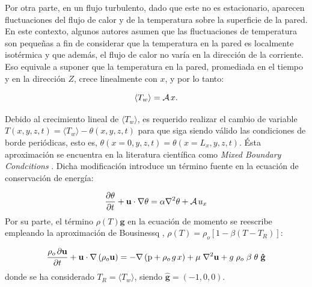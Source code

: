 Por otra parte, en un flujo turbulento, dado que este no es estacionario, aparecen fluctuaciones del flujo de calor y de la temperatura sobre la superficie de la pared. En este contexto, algunos autores \cite{kasagi1992direct,tao1960} asumen que las fluctuaciones de temperatura son pequeñas a fin de considerar que la temperatura en la pared es localmente isotérmica y que además, el flujo de calor no varía en la dirección de la corriente. Eso equivale a suponer que la temperatura en la pared, promediada en el tiempo y en la dirección $Z$, crece linealmente con $x$, y por lo tanto: 

$$
\langle T_w \rangle = \mathcal{A} \hspace{0.5mm} x.
$$

Debido al crecimiento lineal de $\langle T_w \rangle$, es requerido realizar el cambio de variable $T(x,y,z,t) = \langle T_w \rangle - \theta(x,y,z,t)$ para que siga siendo válido las condiciones de borde periódicas, esto es, $\theta(x=0,y,z,t)=\theta(x=L_x,y,z,t)$. Ésta aproximación se encuentra en la literatura científica como \textit{Mixed Boundary Condcitions} \cite{straub2019influence}. Dicha modificación introduce un término fuente en la ecuación de conservación de energía:

\begin{equation}
\frac{ \partial \theta }{ \partial t } + \mathbf{u} \cdot \nabla \theta = \alpha \nabla^2 \theta + \mathcal{A} \hspace{0.5mm} u_x 
\label{eq:energy_pcb_source}
\end{equation}
Por su parte, el término $\rho(T) \mathbf{g}$ en la ecuación de momento se reescribe empleando la aproximación de Bousinessq \cite{incropera}, $\rho(T) = \rho_o \left[ 1 - \beta (T - T_R) \right]$:

\begin{equation}
\frac{ \rho_o \hspace{0.5mm} \partial \mathbf{u}}{\partial t} + \mathbf{u} \cdot \nabla  \left( \rho_o \mathbf{u} \right) = -\nabla \left( \text{p} + \rho_o \hspace{0.5mm} g \hspace{0.5mm} x \right) + \mu \hspace{1mm} {\nabla}^2 \mathbf{u}  + g \hspace{1mm} \rho_o \hspace{1mm} \beta \hspace{1mm} \theta \hspace{1mm} \mathbf{\hat{g}}   
\end{equation}
donde se ha considerado $T_R = \langle T_w \rangle$, siendo $\mathbf{\hat{g}}=(-1,0,0)$.

